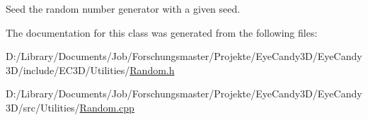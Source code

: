 Seed the random number generator with a given seed. 

The documentation for this class was generated from the following files\+:\begin{DoxyCompactItemize}
\item 
D\+:/\+Library/\+Documents/\+Job/\+Forschungsmaster/\+Projekte/\+Eye\+Candy3\+D/\+Eye\+Candy3\+D/include/\+E\+C3\+D/\+Utilities/\mbox{\hyperlink{_random_8h}{Random.\+h}}\item 
D\+:/\+Library/\+Documents/\+Job/\+Forschungsmaster/\+Projekte/\+Eye\+Candy3\+D/\+Eye\+Candy3\+D/src/\+Utilities/\mbox{\hyperlink{_random_8cpp}{Random.\+cpp}}\end{DoxyCompactItemize}
